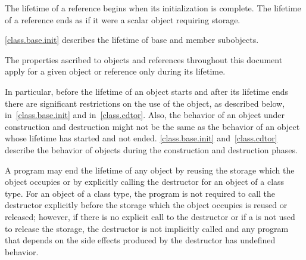 \pnum
{}%
The lifetime of a reference begins when its initialization is complete.
The lifetime of a reference ends as if it were a scalar object requiring storage.

\pnum
\begin{note}
\ref{class.base.init}
describes the lifetime of base and member subobjects.
\end{note}

\pnum
The properties ascribed to objects and references throughout this document
apply for a given object or reference only during its lifetime.
\begin{note}
In particular, before the lifetime of an object starts and after its
lifetime ends there are significant restrictions on the use of the
object, as described below, in~\ref{class.base.init} and
in~\ref{class.cdtor}. Also, the behavior of an object under construction
and destruction might not be the same as the behavior of an object whose
lifetime has started and not ended. \ref{class.base.init}
and~\ref{class.cdtor} describe the behavior of objects during the
construction and destruction phases.
\end{note}

\pnum
A program may end the lifetime of any object by reusing the storage
which the object occupies or by explicitly calling the destructor for an
object of a class type.
For an object of a class type, the program is not required to
call the destructor explicitly before the storage which the object
occupies is reused or released; however, if there is no explicit call to
the destructor or if a 
is not used to release the storage, the destructor is not
implicitly called and any program that depends on the side effects
produced by the destructor has undefined behavior.

